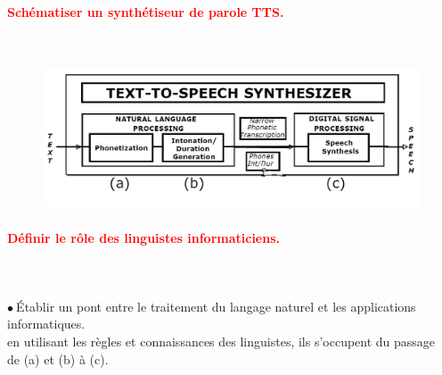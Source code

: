 \documentclass[letterpaper, 12pt]{article}
\newcommand{\alinea}{
\hspace*{0.3cm}}
\newcommand{\red}[1]{
	\textcolor{red}{#1}
}
\newcommand{\point}{$\bullet\ $}
\begin{document}
		\paragraph{\red{Schématiser un synthétiseur de parole TTS.}}~\\
			\begin{figure}[H]
				\centering
				\includegraphics[scale=0.43]{Images/tts}
			\end{figure}\noindent		
		\paragraph{\red{Définir le rôle des linguistes informaticiens.}}~\\~\\
			\point \'Etablir un pont entre le traitement du langage naturel et les applications informatiques.
				\\\alinea en utilisant les règles et connaissances des linguistes, ils s'occupent du passage 
				\\\alinea de (a) et (b) à (c).
\end{document}
